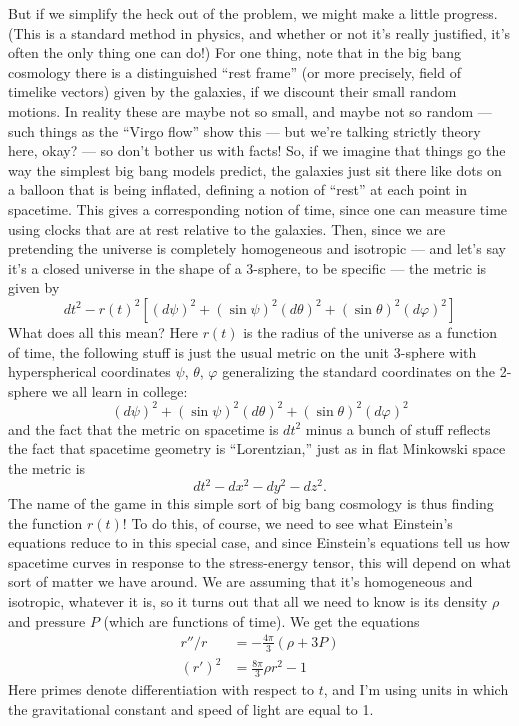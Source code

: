 \documentclass{article}
\begin{document}
But if we simplify the heck out of the problem, we might make a little
progress. (This is a standard method in physics, and whether or not it's
really justified, it's often the only thing one can do!) For one thing,
note that in the big bang cosmology there is a distinguished ``rest
frame'' (or more precisely, field of timelike vectors) given by the
galaxies, if we discount their small random motions. In reality these
are maybe not so small, and maybe not so random --- such things as the
``Virgo flow'' show this --- but we're talking strictly theory here,
okay? --- so don't bother us with facts! So, if we imagine that things
go the way the simplest big bang models predict, the galaxies just sit
there like dots on a balloon that is being inflated, defining a notion
of ``rest'' at each point in spacetime. This gives a corresponding
notion of time, since one can measure time using clocks that are at rest
relative to the galaxies. Then, since we are pretending the universe is
completely homogeneous and isotropic --- and let's say it's a closed
universe in the shape of a 3-sphere, to be specific --- the metric is
given by
\[dt^2-r(t)^2[(d\psi)^2 + (\sin \psi)^2{(d\theta)^2 + (\sin \theta)^2 (d\varphi)^2}]\]
What does all this mean? Here \(r(t)\) is the radius of the universe as
a function of time, the following stuff is just the usual metric on the
unit 3-sphere with hyperspherical coordinates \(\psi\), \(\theta\),
\(\varphi\) generalizing the standard coordinates on the 2-sphere we all
learn in college:
\[(d\psi)^2 + (\sin \psi)^2{(d\theta)^2 + (\sin \theta)^2 (d\varphi)^2}\]
and the fact that the metric on spacetime is \(dt^2\) minus a bunch of
stuff reflects the fact that spacetime geometry is ``Lorentzian,'' just
as in flat Minkowski space the metric is \[dt^2-dx^2-dy^2-dz^2.\] The
name of the game in this simple sort of big bang cosmology is thus
finding the function \(r(t)\)! To do this, of course, we need to see
what Einstein's equations reduce to in this special case, and since
Einstein's equations tell us how spacetime curves in response to the
stress-energy tensor, this will depend on what sort of matter we have
around. We are assuming that it's homogeneous and isotropic, whatever it
is, so it turns out that all we need to know is its density \(\rho\) and
pressure \(P\) (which are functions of time). We get the equations
\[\begin{aligned}r''/r &= -\frac{4\pi}{3}(\rho+3P) \\ (r')^2 &= \frac{8\pi}{3}\rho r^2-1\end{aligned}\]
Here primes denote differentiation with respect to \(t\), and I'm using
units in which the gravitational constant and speed of light are equal
to 1.
\end{document}
